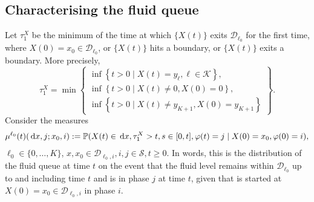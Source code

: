 \subsection{Characterising the fluid queue}
Let \(\tau_1^X\) be the minimum of the time at which \(\{X(t)\}\) exits \(\mathcal D_{\ell_0}\) for the first time, where \(X(0)=x_0\in\mathcal D_{\ell_0}\), or \(\{X(t)\}\) hits a boundary, or \(\{X(t)\}\) exits a boundary. More precisely, 
\[\tau_1^X = \min\left\{\begin{array}{c}\inf\left\{t>0\mid X(t)=y_{\ell}, \ell\in\mathcal K\right\}, \\ \inf\left\{t>0 \mid X(t) \neq 0, X(0)=0\right\}, \\ \inf\left\{t>0 \mid X(t) \neq y_{K+1}, X(0)=y_{K+1}\right\} \end{array} \right\}.\]
Consider the measures 
\begin{align}\label{eqn: sojourn}
	\mu^{\ell_0}(t)(\, \mathrm{d} x,j; x_0,i) := \mathbb P(X(t)\in \, \mathrm{d} x, \tau_1^X>t, s\in[0,t], \varphi(t) = j \mid X(0) = x_0, \varphi(0) = i),
\end{align}
\(\ell_0\in\{0,\dots,K\}\), \(x,x_0 \in\mathcal D_{\ell_0,i}, i,j\in\mathcal S, t \geq 0. \)
In words, this is the distribution of the fluid queue at time \(t\) on the event that the fluid level remains within \(\mathcal D_{\ell_0}\) up to and including time \(t\) and is in phase \(j\) at time \(t\), given that is started at \(X(0)=x_0\in\mathcal D_{\ell_0,i}\) in phase \(i\). 

